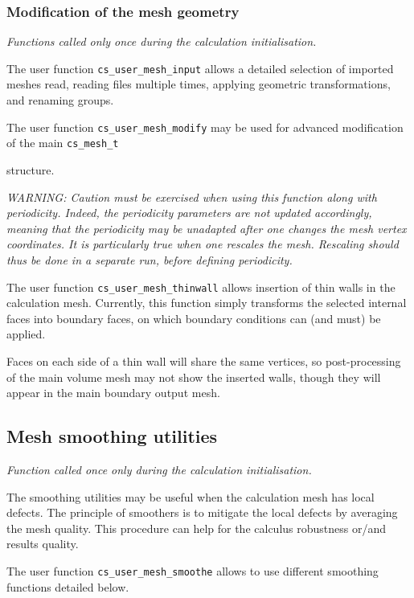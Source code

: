 {{{%
\subsubsection{Modification of the mesh geometry}
\noindent
\textit{Functions called only once during the calculation initialisation.}

The user function \texttt{cs\_user\_mesh\_input} allows a detailed
selection of imported meshes read, reading files multiple times,
applying geometric transformations, and renaming groups.

The user function \texttt{cs\_user\_mesh\_modify} may be used
for advanced modification of the main \texttt{cs\_mesh\_t}} structure.

{\em WARNING: Caution must be exercised when using this function
along with periodicity. Indeed, the periodicity parameters are not
updated accordingly, meaning that the periodicity may be unadapted
after one changes the mesh vertex coordinates. It is particularly
true when one rescales the mesh. Rescaling should thus be done
in a separate run, before defining periodicity.}

The user function \texttt{cs\_user\_mesh\_thinwall} allows
insertion of thin walls in the calculation mesh. Currently, this
function simply transforms the selected internal faces into boundary
faces, on which boundary conditions can (and must) be applied.

Faces on each side of a thin wall will share the same vertices,
so post-processing of the main volume mesh may not show the
inserted walls, though they will appear in the main boundary
output mesh.

\subsection{Mesh smoothing utilities}
\noindent
\textit{Function called once only during the calculation initialisation.}

The smoothing utilities may be useful when the calculation mesh has local
defects.
The principle of smoothers is to mitigate the local defects by averaging
the mesh quality. This procedure can help for the calculus robustness or/and
results quality.

The user function \texttt{cs\_user\_mesh\_smoothe} allows to use different
smoothing functions detailed below.

}}
